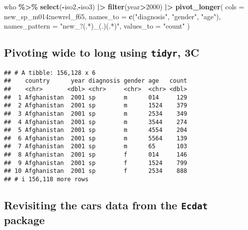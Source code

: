 \documentclass[
  11pt,
]{article}
\newenvironment{Shaded}{\begin{snugshade}}{\end{snugshade}}
\newcommand{\AttributeTok}[1]{\textcolor[rgb]{0.13,0.29,0.53}{#1}}
\newcommand{\DecValTok}[1]{\textcolor[rgb]{0.00,0.00,0.81}{#1}}
\newcommand{\FunctionTok}[1]{\textcolor[rgb]{0.13,0.29,0.53}{\textbf{#1}}}
\newcommand{\NormalTok}[1]{#1}
\newcommand{\SpecialCharTok}[1]{\textcolor[rgb]{0.81,0.36,0.00}{\textbf{#1}}}
\newcommand{\StringTok}[1]{\textcolor[rgb]{0.31,0.60,0.02}{#1}}
\begin{document}
\begin{Shaded}
\begin{Highlighting}[]
\NormalTok{who }\SpecialCharTok{\%\textgreater{}\%} \FunctionTok{select}\NormalTok{(}\SpecialCharTok{{-}}\NormalTok{iso2,}\SpecialCharTok{{-}}\NormalTok{iso3) }\SpecialCharTok{|\textgreater{}} 
  \FunctionTok{filter}\NormalTok{(year}\SpecialCharTok{\textgreater{}}\DecValTok{2000}\NormalTok{) }\SpecialCharTok{|\textgreater{}} 
  \FunctionTok{pivot\_longer}\NormalTok{(}
  \AttributeTok{cols =}\NormalTok{ new\_sp\_m014}\SpecialCharTok{:}\NormalTok{newrel\_f65,}
  \AttributeTok{names\_to =} \FunctionTok{c}\NormalTok{(}\StringTok{"diagnosis"}\NormalTok{, }\StringTok{"gender"}\NormalTok{, }\StringTok{"age"}\NormalTok{),}
  \AttributeTok{names\_pattern =} \StringTok{"new\_?(.*)\_(.)(.*)"}\NormalTok{,}
  \AttributeTok{values\_to =} \StringTok{"count"}
\NormalTok{)}
\end{Highlighting}
\end{Shaded}

\hypertarget{pivoting-wide-to-long-using-tidyr-3c}{%
\subsection{\texorpdfstring{Pivoting wide to long using \texttt{tidyr},
3C}{Pivoting wide to long using tidyr, 3C}}\label{pivoting-wide-to-long-using-tidyr-3c}}

\footnotesize

\begin{verbatim}
## # A tibble: 156,128 x 6
##    country      year diagnosis gender age   count
##    <chr>       <dbl> <chr>     <chr>  <chr> <dbl>
##  1 Afghanistan  2001 sp        m      014     129
##  2 Afghanistan  2001 sp        m      1524    379
##  3 Afghanistan  2001 sp        m      2534    349
##  4 Afghanistan  2001 sp        m      3544    274
##  5 Afghanistan  2001 sp        m      4554    204
##  6 Afghanistan  2001 sp        m      5564    139
##  7 Afghanistan  2001 sp        m      65      103
##  8 Afghanistan  2001 sp        f      014     146
##  9 Afghanistan  2001 sp        f      1524    799
## 10 Afghanistan  2001 sp        f      2534    888
## # i 156,118 more rows
\end{verbatim}

\normalsize

\hypertarget{revisiting-the-cars-data-from-the-ecdat-package}{%
\subsection{\texorpdfstring{Revisiting the cars data from the
\texttt{Ecdat}
package}{Revisiting the cars data from the Ecdat package}}\label{revisiting-the-cars-data-from-the-ecdat-package}}
\end{document}
